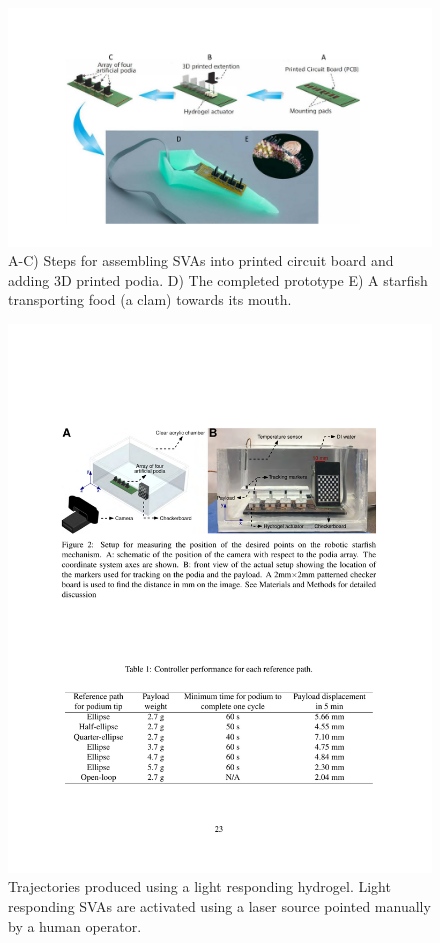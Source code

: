 \begin{figure}[!th]
      \centering
      \includegraphics[width=1\textwidth]{starfish.pdf}
      \caption[A starfish inspired minature robot]{A-C) Steps for assembling SVAs into printed circuit board and adding 3D printed podia. D) The completed prototype E) A starfish transporting food (a clam) towards its mouth.}
      \label{fig:starfish}
\end{figure}


\begin{figure}[!th]
      \centering
      \includegraphics[width=1\textwidth]{setupCheckerboard.pdf}
      \caption[Trajectories using a light responding hydrogel]{Trajectories produced using a light responding hydrogel. Light responding SVAs are activated using a laser source pointed manually by a human operator.}
      \label{fig:setupCheckerboard}
\end{figure}

